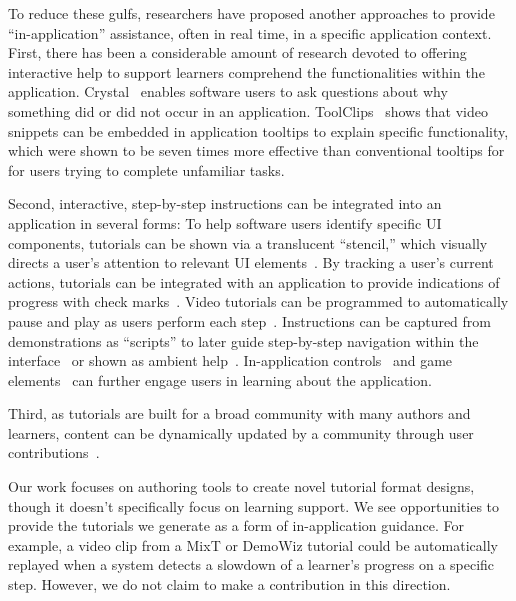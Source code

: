To reduce these gulfs, researchers have proposed another approaches to provide ``in-application'' assistance, often in real time, in a specific application context.
First, there has been a considerable amount of research devoted to offering interactive help to support learners comprehend the functionalities within the application.
%
Crystal~\cite{Myers:2006:AWW:1124772.1124832} enables software users to ask questions about why something did or did not occur in an application.
%
ToolClips~\cite{Grossman:2010wr} shows that video snippets can be embedded in application tooltips to explain specific functionality, which were shown to be seven times more effective than conventional tooltips for for users trying to complete unfamiliar tasks.

Second, interactive, step-by-step instructions can be integrated into an application in several forms:
%
To help software users identify specific UI components, tutorials can be shown via a translucent ``stencil,'' which visually directs a user's attention to relevant UI elements~\cite{Kelleher:2005:STD:1054972.1055047}.
%
By tracking a user's current actions, tutorials can be integrated with an application to provide indications of progress with check marks~\cite{Fernquist:2011:SRE:2047196.2047245}. Video tutorials can be programmed to automatically pause and play as users perform each step~\cite{Pongnumkul:2011ju}. Instructions can be captured from demonstrations as ``scripts'' to later guide step-by-step navigation within the interface~\cite{Bergman:2005:DocWizards} or shown as ambient help~\cite{Matejka:2011:AH:1978942.1979349}. In-application controls~\cite{Lieberman:2014:SML:2557500.2557543} and game elements~\cite{Li:2014:CGM:2556288.2556954, Dontcheva:2014:CCL:2556288.2557217} can further engage users in learning about the application.

Third, as tutorials are built for a broad community with many authors and learners, content can be dynamically updated by a community through user contributions~\cite{Lafreniere:2013ff,Matejka:2009:CCR:1622176.1622214, Bunt:2014:TPI:2556288.2557118}.

Our work focuses on authoring tools to create novel tutorial format designs, though it doesn't specifically focus on learning support. We see opportunities to provide the tutorials we generate as a form of in-application guidance. For example, a video clip from a MixT or DemoWiz tutorial could be automatically replayed when a system detects a slowdown of a learner's progress on a specific step. However, we do not claim to make a contribution in this direction.


